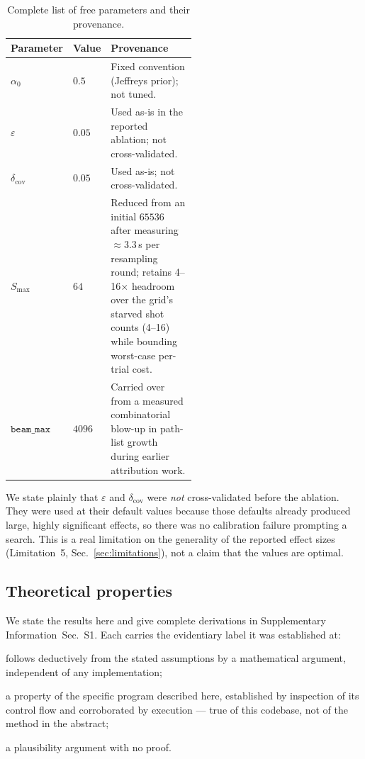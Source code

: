 \documentclass[preprint,11pt]{elsarticle}
\newcommand{\PROVEN}{\textsc{(proven)}}
\newcommand{\HEUR}{\textsc{(heuristic)}}
\newcommand{\INVAR}{\textsc{(implementation invariant)}}
\newcommand{\SI}{Supplementary Information}
\newcommand{\SIproofs}{\SI{}~Sec.~S1}
\newcommand{\dcov}{\delta_{\mathrm{cov}}}
\newcommand{\Smax}{S_{\max}}
\newcommand{\beammax}{\texttt{beam\_max}}
\begin{document}
\begin{table}[htbp]
\centering\small
\caption{Complete list of free parameters and their provenance.}
\label{tab:params}
\begin{tabular}{@{}llp{0.52\linewidth}@{}}
\toprule
Parameter & Value & Provenance \\
\midrule
$\alpha_0$   & $0.5$  & Fixed convention (Jeffreys prior); not tuned. \\
$\varepsilon$& $0.05$ & Used as-is in the reported ablation; not cross-validated. \\
$\dcov$      & $0.05$ & Used as-is; not cross-validated. \\
$\Smax$      & $64$   & Reduced from an initial $65536$ after measuring ${\approx}3.3$\,s per resampling round; retains 4--16$\times$ headroom over the grid's starved shot counts (4--16) while bounding worst-case per-trial cost. \\
$\beammax$   & $4096$ & Carried over from a measured combinatorial blow-up in path-list growth during earlier attribution work. \\
\bottomrule
\end{tabular}
\end{table}

We state plainly that $\varepsilon$ and $\dcov$ were \emph{not}
cross-validated before the ablation. They were used at their default
values because those defaults already produced large, highly significant
effects, so there was no calibration failure prompting a search. This is
a real limitation on the generality of the reported effect sizes
(Limitation~5, Sec.~\ref{sec:limitations}), not a claim that the
values are optimal.

\subsection{Theoretical properties}
\label{sec:properties}

We state the results here and give complete derivations in \SIproofs{}.
Each carries the evidentiary label it was established at:

\begin{description}\itemsep1pt
\item[\PROVEN{}] follows deductively from the stated assumptions by a
mathematical argument, independent of any implementation;
\item[\INVAR{}] a property of the specific program described here,
established by inspection of its control flow and corroborated by
execution --- true of this codebase, not of the method in the abstract;
\item[\HEUR{}] a plausibility argument with no proof.
\end{description}
\end{document}
